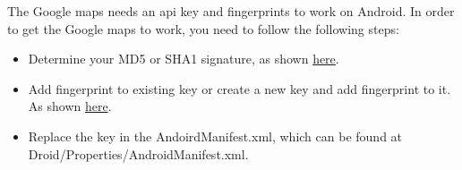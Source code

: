 \documentclass[12pt]{article}
\begin{document}
	The Google maps needs an api key and fingerprints to work on Android.
	In order to get the Google maps to work, you need to follow the following steps:
	\begin{itemize}
		\item Determine your MD5 or SHA1 signature, as shown \href{https://developer.xamarin.com/guides/android/deployment,_testing,_and_metrics/MD5_SHA1/}{here}.
		\item Add fingerprint to existing key or create a new key and add fingerprint to it. As shown \href{https://developers.google.com/maps/documentation/android-api/signup#get_an_android_api_key}{here}.
		\item Replace the key in the AndoirdManifest.xml, which can be found at \\ \mbox{Droid/Properties/AndroidManifest.xml}.
	\end{itemize}

	\clearpage
\end{document}
